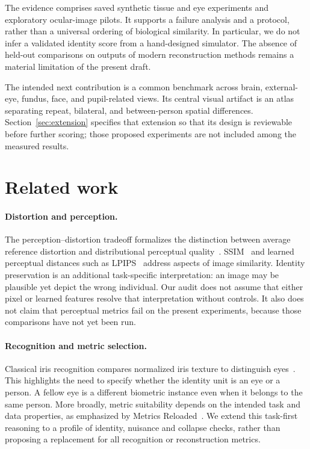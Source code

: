 \documentclass[10pt,twocolumn,letterpaper]{article}
\begin{document}
The evidence comprises saved synthetic tissue and eye experiments and exploratory ocular-image pilots. It supports a failure analysis and a protocol, rather than a universal ordering of biological similarity. In particular, we do not infer a validated identity score from a hand-designed simulator. The absence of held-out comparisons on outputs of modern reconstruction methods remains a material limitation of the present draft.

The intended next contribution is a common benchmark across brain, external-eye, fundus, face, and pupil-related views. Its central visual artifact is an atlas separating repeat, bilateral, and between-person spatial differences. Section~\ref{sec:extension} specifies that extension so that its design is reviewable before further scoring; those proposed experiments are not included among the measured results.

\section{Related work}
\paragraph{Distortion and perception.}
The perception--distortion tradeoff formalizes the distinction between average reference distortion and distributional perceptual quality~\cite{blau2018}. SSIM~\cite{wang2004} and learned perceptual distances such as LPIPS~\cite{zhang2018lpips} address aspects of image similarity. Identity preservation is an additional task-specific interpretation: an image may be plausible yet depict the wrong individual. Our audit does not assume that either pixel or learned features resolve that interpretation without controls. It also does not claim that perceptual metrics fail on the present experiments, because those comparisons have not yet been run.

\paragraph{Recognition and metric selection.}
Classical iris recognition compares normalized iris texture to distinguish eyes~\cite{daugman2004}. This highlights the need to specify whether the identity unit is an eye or a person. A fellow eye is a different biometric instance even when it belongs to the same person. More broadly, metric suitability depends on the intended task and data properties, as emphasized by Metrics Reloaded~\cite{maierhein2024}. We extend this task-first reasoning to a profile of identity, nuisance and collapse checks, rather than proposing a replacement for all recognition or reconstruction metrics.
\end{document}
